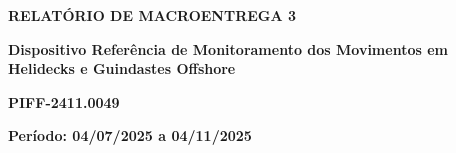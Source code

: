 \begin{center}
    \LARGE
    \textbf{RELATÓRIO DE MACROENTREGA 3}

    \vspace{0.6cm}
    \normalsize

    \begin{minipage}{.90\linewidth}
        \centering
        \textbf{
            Dispositivo Referência de Monitoramento dos Movimentos em Helidecks e Guindastes Offshore
        }
    
        \vspace{.6cm}
        \textbf{PIFF-2411.0049}
        \normalsize
    \end{minipage}
    
    \vspace{1.2cm}
    
    \begin{flushleft}
     \phantom{a.}\textbf{Período: 04/07/2025 a 04/11/2025}
    \end{flushleft}
    

\end{center}
